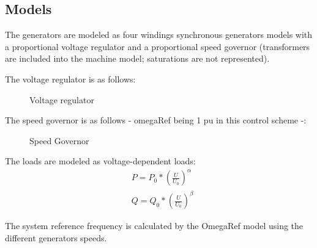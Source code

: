 \documentclass[a4paper, 12pt]{report}
\begin{document}
\subsection{Models}

The generators are modeled as four windings synchronous generators models with a proportional voltage regulator and a proportional speed governor (transformers are included into the machine model; saturations are not represented).

The voltage regulator is as follows:
\begin{figure}[H]
\centering
{}
\caption{Voltage regulator}
\end{figure}

The speed governor is as follows - omegaRef being 1 pu in this control scheme -:
\begin{figure}[H]
\centering
{}
\caption{Speed Governor}
\end{figure}

The loads are modeled as voltage-dependent loads:
\begin{equation*}
\begin{aligned}
& P = P_{0} * (\frac{U}{U_{0}})^\alpha \\
& Q = Q_{0} * (\frac{U}{U_{0}})^\beta
\end{aligned}
\label{Voltage-dependent load model}
\end{equation*}

The system reference frequency is calculated by the OmegaRef model using the different generators speeds.\\
\end{document}
